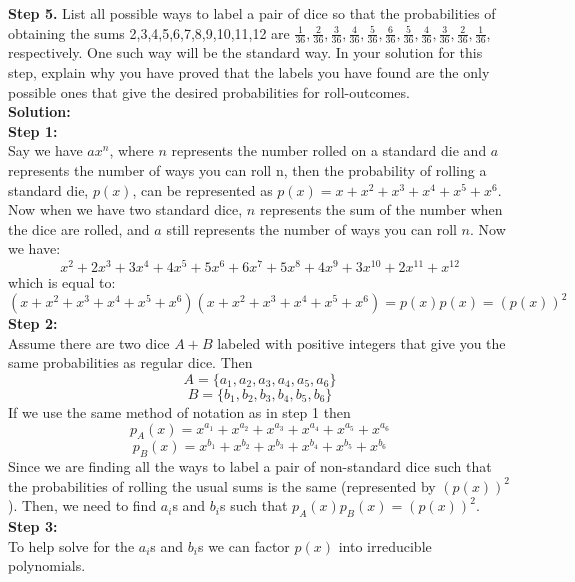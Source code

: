 \documentclass[10pt,a4paper]{report}
\begin{document}
	\newline
	\textbf{Step 5.} List all possible ways to label a pair of dice so that the probabilities of obtaining the sums 2,3,4,5,6,7,8,9,10,11,12 are $\frac{1}{36},\frac{2}{36},\frac{3}{36},\frac{4}{36},\frac{5}{36},\frac{6}{36},\frac{5}{36},\frac{4}{36},\frac{3}{36},\frac{2}{36},\frac{1}{36}$, respectively.  One such way will be the standard way.  In your solution for this step, explain why you have proved that the labels you have found are the only possible ones that give the desired probabilities for roll-outcomes.\\
	\newline
	\textbf{Solution: }\\
	\newline
	\textbf{Step 1:}\\
	Say we have $ax^n$, where $n$ represents the number rolled on a standard die and $a$ represents the number of ways you can roll n, then the probability of rolling a standard die, $p(x)$, can be represented as $p(x) = x + x^2 + x^3 + x^4 + x^5 + x^6$.\\
	Now when we have two standard dice, $n$ represents the sum of the number when the dice are rolled, and $a$ still represents the number of ways you can roll $n$.  Now we have:\\
	\[x^2 + 2x^3 + 3x^4 + 4x^5 + 5x^6 + 6x^7 + 5x^8 + 4x^9 + 3x^{10} + 2x^{11} + x^{12} \]
	which is equal to:\\
	\[(x + x^2 + x^3 + x^4 + x^5 + x^6)(x + x^2 + x^3 + x^4 + x^5 + x^6) = p(x)p(x) = (p(x))^2 \]
	\newline
	\textbf{Step 2:}\\
	Assume there are two dice $A+B$ labeled with positive integers that give you the same probabilities as regular dice.  Then \[A = \{a_1, a_2, a_3, a_4, a_5, a_6 \}\]
	\[B = \{b_1, b_2, b_3, b_4, b_5, b_6 \}\]
	If we use the same method of notation as in step 1 then
	\[p_A(x) = x^{a_1} + x^{a_2} + x^{a_3} + x^{a_4} + x^{a_5} + x^{a_6}\]
	\[p_B(x) = x^{b_1} + x^{b_2} + x^{b_3} + x^{b_4} + x^{b_5} + x^{b_6} \]
	Since we are finding all the ways to label a pair of non-standard dice such that the probabilities of rolling the usual sums is the same (represented by $(p(x))^2$).  Then, we need to find $a_i$s and $b_i$s such that $p_A(x)p_B(x) = (p(x))^2$.\\
	\newline
	\textbf{Step 3:}\\
	To help solve for the $a_i$s and $b_i$s we can factor $p(x)$ into irreducible polynomials.
\end{document}
